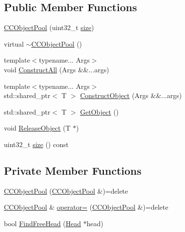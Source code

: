 \subsection*{Public Member Functions}
\begin{DoxyCompactItemize}
\item 
\hyperlink{classapollo_1_1cyber_1_1base_1_1CCObjectPool_aef6bb40c0a7105fcafa6f36eec1990f1}{C\-C\-Object\-Pool} (uint32\-\_\-t \hyperlink{classapollo_1_1cyber_1_1base_1_1CCObjectPool_a60a5ad05a90e7c32542454162b46b2cc}{size})
\item 
virtual \hyperlink{classapollo_1_1cyber_1_1base_1_1CCObjectPool_a66e73519d6e04f2575f474132677cd65}{$\sim$\-C\-C\-Object\-Pool} ()
\item 
{\footnotesize template$<$typename... Args$>$ }\\void \hyperlink{classapollo_1_1cyber_1_1base_1_1CCObjectPool_ab92a199f84762cd01e980c960c8d0990}{Construct\-All} (Args \&\&...args)
\item 
{\footnotesize template$<$typename... Args$>$ }\\std\-::shared\-\_\-ptr$<$ T $>$ \hyperlink{classapollo_1_1cyber_1_1base_1_1CCObjectPool_aa0be7adc9df9571d064f0d0f85c99398}{Construct\-Object} (Args \&\&...args)
\item 
std\-::shared\-\_\-ptr$<$ T $>$ \hyperlink{classapollo_1_1cyber_1_1base_1_1CCObjectPool_a2185323d56b9150be49dd891fa9823bd}{Get\-Object} ()
\item 
void \hyperlink{classapollo_1_1cyber_1_1base_1_1CCObjectPool_a32587174920cbf5b3ff400bb2870b49d}{Release\-Object} (T $\ast$)
\item 
uint32\-\_\-t \hyperlink{classapollo_1_1cyber_1_1base_1_1CCObjectPool_a60a5ad05a90e7c32542454162b46b2cc}{size} () const 
\end{DoxyCompactItemize}
\subsection*{Private Member Functions}
\begin{DoxyCompactItemize}
\item 
\hyperlink{classapollo_1_1cyber_1_1base_1_1CCObjectPool_a816f40fca7251af2f4296cbb061cf33f}{C\-C\-Object\-Pool} (\hyperlink{classapollo_1_1cyber_1_1base_1_1CCObjectPool}{C\-C\-Object\-Pool} \&)=delete
\item 
\hyperlink{classapollo_1_1cyber_1_1base_1_1CCObjectPool}{C\-C\-Object\-Pool} \& \hyperlink{classapollo_1_1cyber_1_1base_1_1CCObjectPool_ac870b2539ea47c8ae31fc27c4e3bc8d8}{operator=} (\hyperlink{classapollo_1_1cyber_1_1base_1_1CCObjectPool}{C\-C\-Object\-Pool} \&)=delete
\item 
bool \hyperlink{classapollo_1_1cyber_1_1base_1_1CCObjectPool_acbaa170bbe0171d605f3f640626685ba}{Find\-Free\-Head} (\hyperlink{structapollo_1_1cyber_1_1base_1_1CCObjectPool_1_1Head}{Head} $\ast$head)
\end{DoxyCompactItemize}
